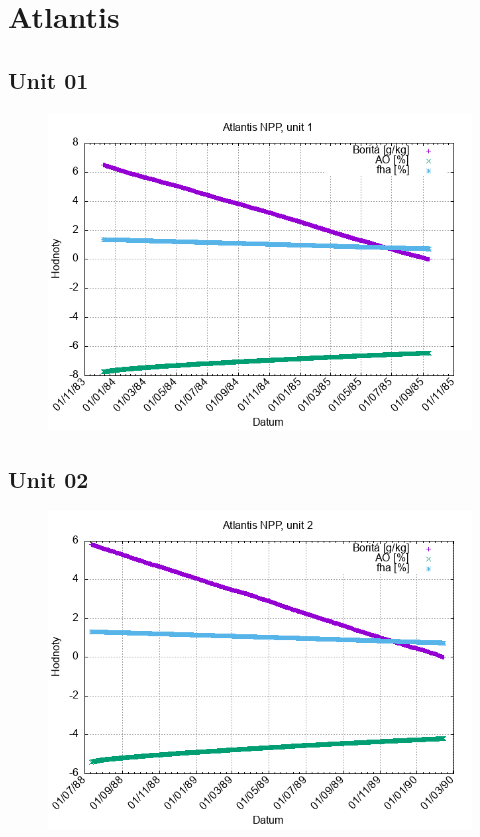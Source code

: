 \documentclass{article}
\begin{document}
\section*{Atlantis}
\subsection*{Unit 01}
\begin{figure}[h!]
\centering
\includegraphics[width=14cm]{./grafy/Atlantis01.png}
\end{figure}
\clearpage
\subsection*{Unit 02}
\begin{figure}[h!]
\centering
\includegraphics[width=14cm]{./grafy/Atlantis02.png}
\end{figure}
\clearpage
\end{document}
